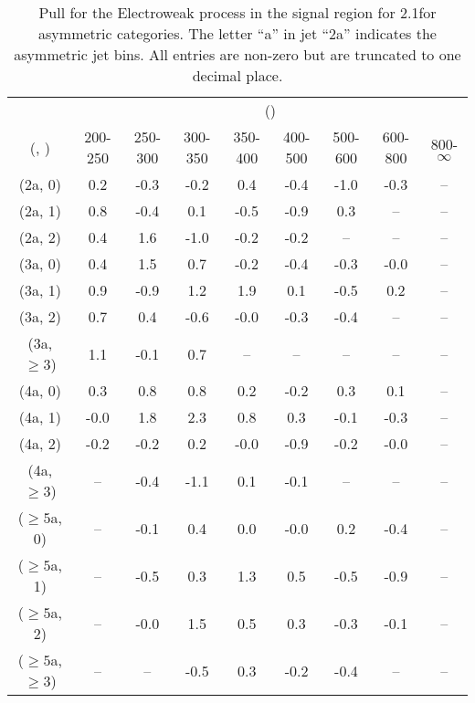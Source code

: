 \begin{table}[h!]
\tiny
\centering
\caption{Pull for the Electroweak process in the signal region for 2.1\ifb for asymmetric categories. The letter ``a'' in jet \eg ``2a''  indicates the asymmetric jet bins. All entries are non-zero but are truncated to one decimal place.\label{tab:pullsepnaive_sig_ewk_asym}}
\begin{tabular}
{ccccccccc}
	\hline\hline
	& \multicolumn{8}{c}{\scalht (\gev)} \\ 
	 (\njet,  \nb) & 200-250 & 250-300 & 300-350 & 350-400 & 400-500 & 500-600 & 600-800 & 800-$\infty$ \\ [0.8ex] 
\hline
	(2a, 0) & 0.2 & -0.3 & -0.2 & 0.4 & -0.4 & -1.0 & -0.3 & -- \\[0.5ex] 
	(2a, 1) & 0.8 & -0.4 & 0.1 & -0.5 & -0.9 & 0.3 & -- & -- \\[0.5ex] 
	(2a, 2) & 0.4 & 1.6 & -1.0 & -0.2 & -0.2 & -- & -- & -- \\[0.5ex] 
	(3a, 0) & 0.4 & 1.5 & 0.7 & -0.2 & -0.4 & -0.3 & -0.0 & -- \\[0.5ex] 
	(3a, 1) & 0.9 & -0.9 & 1.2 & 1.9 & 0.1 & -0.5 & 0.2 & -- \\[0.5ex] 
	(3a, 2) & 0.7 & 0.4 & -0.6 & -0.0 & -0.3 & -0.4 & -- & -- \\[0.5ex] 
	(3a, $\ge3$) & 1.1 & -0.1 & 0.7 & -- & -- & -- & -- & -- \\[0.5ex] 
	(4a, 0) & 0.3 & 0.8 & 0.8 & 0.2 & -0.2 & 0.3 & 0.1 & -- \\[0.5ex] 
	(4a, 1) & -0.0 & 1.8 & 2.3 & 0.8 & 0.3 & -0.1 & -0.3 & -- \\[0.5ex] 
	(4a, 2) & -0.2 & -0.2 & 0.2 & -0.0 & -0.9 & -0.2 & -0.0 & -- \\[0.5ex] 
	(4a, $\ge3$) & -- & -0.4 & -1.1 & 0.1 & -0.1 & -- & -- & -- \\[0.5ex] 
	($\ge5$a, 0) & -- & -0.1 & 0.4 & 0.0 & -0.0 & 0.2 & -0.4 & -- \\[0.5ex] 
	($\ge5$a, 1) & -- & -0.5 & 0.3 & 1.3 & 0.5 & -0.5 & -0.9 & -- \\[0.5ex] 
	($\ge5$a, 2) & -- & -0.0 & 1.5 & 0.5 & 0.3 & -0.3 & -0.1 & -- \\[0.5ex] 
	($\ge5$a, $\ge3$) & -- & -- & -0.5 & 0.3 & -0.2 & -0.4 & -- & -- \\[0.5ex] 
	\hline
	\hline
\end{tabular}
\end{table}
